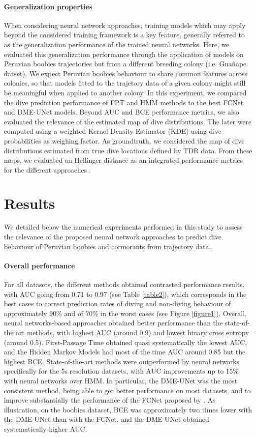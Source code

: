 \documentclass{article}
\begin{document}
\paragraph{Generalization properties}
When considering neural network approaches, training models which may apply beyond the considered training framework is a key feature, generally referred to as the generalization performance of the trained neural networks. Here, we evaluated this generalization performance through the application of models on Peruvian boobies trajectories but from a different breeding colony (i.e. Gua\~nape datset). We expect Peruvian boobies behaviour to share common features across colonies, so that models fitted to the trajetory data of a given colony might still be meaningful when applied to another colony.
In this experiment, we compared the dive prediction performance of FPT and HMM methods to the best FCNet and DME-UNet models. Beyond AUC and BCE performance metrics, we also evaluated the relevance of the estimated map of dive distributions. The later were computed using a weighted Kernel Density Estimator (KDE) using dive probabilities as weighing factor. As groundtruth, we considered the map of dive distributions estimated from true dive locations defined by TDR data. From these maps, we evaluated an Hellinger distance as an integrated performance metrics for the different approaches \citep{wilson_distancebased_2011}.

\section{Results}

We detailed below the numerical experiments performed in this study to assess the relevance of the proposed neural network approaches to predict dive behaviour of Peruvian boobies and cormorants from trajectory data.

\paragraph{Overall performance}
For all datasets, the different methods obtained contrasted performance results, with AUC going from 0.71 to 0.97 (see Table \ref{table2}), which corresponds in the best cases to correct prediction rates of diving and non-diving behaviour of approximately 90\% and of 70\% in the worst cases (see Figure \ref{figure1}). Overall, neural networks-based approaches obtained better performance than the state-of-the art methods, with highest AUC (around 0.9) and lowest binary cross entropy (around 0.5). First-Passage Time obtained quasi systematically the lowest AUC, and the Hidden Markov Models had most of the time AUC around 0.85 but the highest BCE. State-of-the-art methods were outperformed by neural networks specifically for the 5s resolution datasets, with AUC improvements up to 15\% with neural networks over HMM. In particular, the DME-UNet was the most consistent method, being able to get better performance on most datasets, and to improve substantially the performance of the FCNet proposed by \citep{browning_predicting_2018}. As illustration, on the boobies dataset, BCE was approximately two times lower with the DME-UNet than with the FCNet, and the DME-UNet obtained systematically higher AUC.
\end{document}
